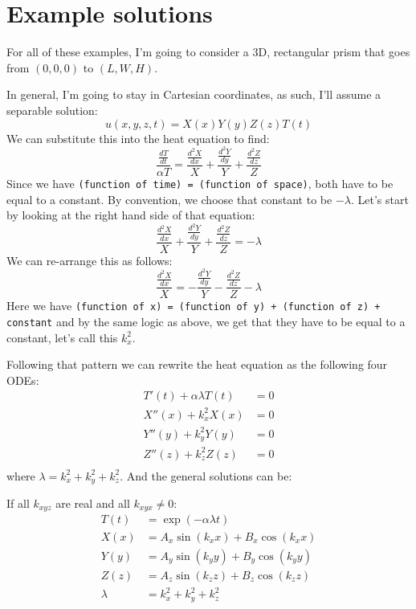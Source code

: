 \documentclass{article}
\begin{document}
\section{Example solutions}

For all of these examples, I'm going to consider a 3D, rectangular prism that goes from
$(0,0,0)$ to $(L,W,H)$.

In general, I'm going to stay in Cartesian coordinates, as such, I'll assume a separable
solution:
$$
u(x,y,z,t) = X(x)Y(y)Z(z)T(t)
$$
We can substitute this into the heat equation to find:
\[
  \frac{\frac{dT}{dt}}{\alpha T} = \frac{\frac{d^2X}{dx}}{X} + \frac{\frac{d^2Y}{dy}}{Y} +
  \frac{\frac{d^2Z}{dz}}{Z}
\]
Since we have \texttt{(function of time) = (function of space)}, both have to be equal to a
constant. By convention, we choose that constant to be $-\lambda$. Let's start by looking at
the right hand side of that equation:
\[
  \frac{\frac{d^2X}{dx}}{X} + \frac{\frac{d^2Y}{dy}}{Y} + \frac{\frac{d^2Z}{dz}}{Z} = -\lambda
\]
We can re-arrange this as follows:
\[
  \frac{\frac{d^2X}{dx}}{X} = -\frac{\frac{d^2Y}{dy}}{Y} - \frac{\frac{d^2Z}{dz}}{Z} -\lambda
\]
Here we have \texttt{(function of x) = (function of y) + (function of z) + constant} and by the
same logic as above, we get that they have to be equal to a constant, let's call this $k_x^2$.

Following that pattern we can rewrite the heat equation as the following four ODEs:
\begin{align*}
  T'(t) + \alpha\lambda T(t) &= 0 \\
  X''(x) + k_x^2 X(x) &= 0 \\
  Y''(y) + k_y^2 Y(y) &= 0 \\
  Z''(z) + k_z^2 Z(z) &= 0 \\
\end{align*}
where $\lambda = k_x^2 + k_y^2 + k_z^2$. And the general solutions can be:

If all $k_{xyz}$ are real and all $k_{xyx} \neq 0$:
\begin{align*}
  T(t) &= \exp\left(-\alpha \lambda t\right) \\
  X(x) &= A_x \sin\left(k_x x\right) + B_x \cos\left(k_x x\right) \\
  Y(y) &= A_y \sin\left(k_y y\right) + B_y \cos\left(k_y y\right) \\
  Z(z) &= A_z \sin\left(k_z z\right) + B_z \cos\left(k_z z\right) \\
  \lambda &= k_x^2 + k_y^2 + k_z^2
\end{align*}
\end{document}
